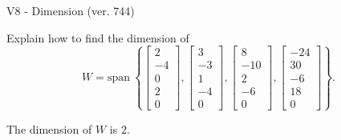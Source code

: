 \begin{exercise}
  \begin{exerciseTitle}V8 - Dimension (ver. 744)\end{exerciseTitle}
  \begin{exerciseStatement}
    Explain how to find the dimension of 
\[W=\mathrm{span}\ \left\{\left[\begin{array}{r}
2 \\
-4 \\
0 \\
2 \\
0
\end{array}\right] , \left[\begin{array}{r}
3 \\
-3 \\
1 \\
-4 \\
0
\end{array}\right] , \left[\begin{array}{r}
8 \\
-10 \\
2 \\
-6 \\
0
\end{array}\right] , \left[\begin{array}{r}
-24 \\
30 \\
-6 \\
18 \\
0
\end{array}\right]\right\}.\]



  \end{exerciseStatement}
  \begin{exerciseAnswer}
   The dimension of \(W\) is  \(2\).
  


  \end{exerciseAnswer}
\end{exercise}